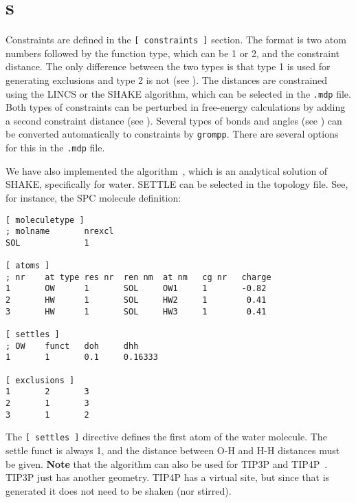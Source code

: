 \section{s}
\label{sec:constraints}
Constraints are defined in the {\tt [~constraints~]} section.
The format is two atom numbers followed by the function type,
which can be 1 or 2, and the constraint distance.
The only difference between the two types is that type 1 is used
for generating exclusions and type 2 is not (see ).
The distances are constrained using the LINCS or the SHAKE algorithm,
which can be selected in the {\tt *.mdp} file.
Both types of constraints can be perturbed in free-energy calculations
by adding a second constraint distance (see ).
Several types of bonds and angles (see ) can
be converted automatically to constraints by {\tt grompp}.
There are several options for this in the {\tt *.mdp} file.

We have also implemented the  algorithm~\cite{Miyamoto92},
which is an analytical solution of SHAKE, specifically for water. 
SETTLE can be selected in the topology file. See, for instance, the
SPC molecule definition:

{\small
\begin{verbatim}
[ moleculetype ]
; molname       nrexcl
SOL             1

[ atoms ]
; nr    at type res nr  ren nm  at nm   cg nr   charge
1       OW      1       SOL     OW1     1       -0.82
2       HW      1       SOL     HW2     1        0.41
3       HW      1       SOL     HW3     1        0.41

[ settles ]
; OW    funct   doh     dhh
1       1       0.1     0.16333

[ exclusions ]
1       2       3
2       1       3
3       1       2
\end{verbatim}}

The {\tt [~settles~]} directive defines the first atom of the water molecule.
The settle funct is always 1, and the distance between O-H and H-H distances
must be given. {\bf Note} that the algorithm can also be used
for TIP3P and TIP4P~\cite{Jorgensen83}.
TIP3P just has another geometry. TIP4P has a virtual site, but since 
that is generated it does not need to be shaken (nor stirred).

